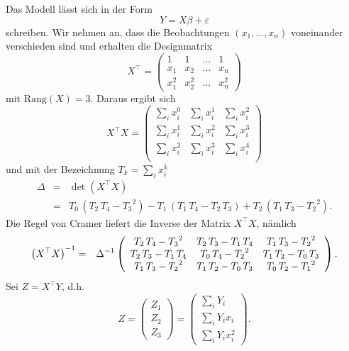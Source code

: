 \solution Das Modell lässt sich in der Form
\begin{equation*}
    Y = X \beta + \varepsilon
\end{equation*}
schreiben. Wir nehmen an, dass die Beobachtungen $\left( x_1,\ldots, x_n \right)$ 
voneinander verschieden sind und erhalten die Designmatrix
\begin{equation*}
    X^\top = \left(
    \begin{array}{cccc}
        1       & 1     & \ldots & 1 \\
        x_1     & x_2   & \ldots & x_n \\
        x_1^2   & x_2^2 & \ldots & x_n^2
    \end{array}
    \right)
\end{equation*} 
mit $\textrm{Rang}(X) = 3$. Daraus ergibt sich
\begin{equation*}
    X^\top X = \left(
    \begin{array}{ccc}
        \sum_{i}^{} x_i^0 & \sum_{i}^{} x_i^1 & \sum_{i}^{} x_i^2 \\
        \sum_{i}^{} x_i^1 & \sum_{i}^{} x_i^2 & \sum_{i}^{} x_i^3 \\
        \sum_{i}^{} x_i^2 & \sum_{i}^{} x_i^3 & \sum_{i}^{} x_i^4 \\
    \end{array}
    \right)
\end{equation*}
und mit der Bezeichnung $T_k = \sum_{i}^{} x_i^k$ 
\begin{eqnarray*}
    \Delta &=&  \det \left( X^\top X \right) \\
    &=& { T_0}\,\left({ T_2}\,{ T_4}-{ T_3}^2\right)-{ T_1}\,\left({ T_1}\,{ T_4}-{ T_2}\,{ T_3}\right)+{ T_2}\,\left({ T_1}\,{ T_3}-{ T_2}^2\right).
\end{eqnarray*}
Die Regel von Cramer liefert die Inverse der Matrix $X^\top X$, nämlich
\begin{eqnarray*}
    \left( X^\top X \right)^{-1} &=& \Delta^{-1} \left(
    \begin{array}{ccc}
{ T_2}\,{ T_4}-{ T_3}^2&{ T_2}\,{ T_3}-
 { T_1}\,{ T_4}&{ T_1}\,{ T_3}-{ T_2}^2\cr { T_2}\,
 { T_3}-{ T_1}\,{ T_4}&{ T_0}\,{ T_4}-{ T_2}^2&
 { T_1}\,{ T_2}-{ T_0}\,{ T_3}\cr { T_1}\,{ T_3}-
 { T_2}^2&{ T_1}\,{ T_2}-{ T_0}\,{ T_3}&{ T_0}\,
 { T_2}-{ T_1}^2
    \end{array}
    \right). 
\end{eqnarray*}
Sei $Z = X^\top Y$, d.h.\
\begin{equation*}
    Z = \left(
    \begin{array}{c}
        Z_1 \\ Z_2 \\ Z_3
    \end{array}
    \right) = \left(
    \begin{array}{c}
        \sum_{i}^{} Y_i \\ \sum_{i}^{} Y_i x_i \\ \sum_{i} Y_i x_i^2
    \end{array}
    \right).
\end{equation*}
